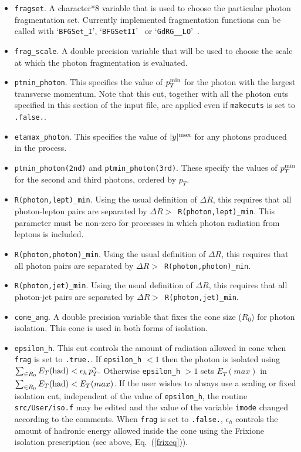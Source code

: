 \documentclass[12pt]{article}
\begin{document}
\begin{itemize}
\item {\tt fragset}. A character*8 variable that is used to choose the particular photon fragmentation set.
Currently implemented fragmentation functions can be called with `{\tt BFGSet\_I}', `{\tt BFGSetII}'~\cite{Bourhis:1997yu}
or `{\tt GdRG\_\_LO}'~\cite{GehrmannDeRidder:1998ba}.  

\item {\tt frag\_scale}. A double precision variable that will be used to choose the scale 
at which the photon fragmentation is evaluated. 

\item {\tt ptmin\_photon}. This specifies the value
of $p_T^{\rm min}$ for the photon with the largest transverse momentum.
Note that this cut, together with all the photon cuts specified in this section
of the input file, are applied even if {\tt makecuts} is set to {\tt .false.}.

\item {\tt etamax\_photon}. This specifies the value
of $|y|^{\rm max}$ for any photons produced in the process.

\item {\tt ptmin\_photon(2nd)} and {\tt ptmin\_photon(3rd)}. These specify the values
of $p_T^{\rm min}$ for the second and third photons, ordered by $p_T$.

\item {\tt R(photon,lept)\_min}. Using the usual definition of $\Delta R$,
this requires that all photon-lepton pairs are separated by
$\Delta R >$~{\tt R(photon,lept)\_min}. This parameter must be non-zero
for processes in which photon radiation from leptons is included.

\item {\tt R(photon,photon)\_min}. Using the usual definition of $\Delta R$,
this requires that all photon pairs are separated by
$\Delta R >$~{\tt R(photon,photon)\_min}.

\item {\tt R(photon,jet)\_min}. Using the usual definition of $\Delta R$,
this requires that all photon-jet pairs are separated by
$\Delta R >$~{\tt R(photon,jet)\_min}.

\item {\tt cone\_ang}. A double precision variable that fixes the cone size ($R_0$) for photon isolation.
This cone is used in both forms of isolation. 

\item {\tt epsilon\_h}. This cut controls the amount of radiation allowed in cone when  {\tt frag} is set to {\tt .true.}. If  {\tt epsilon\_h} $ < 1$ then the photon is isolated using
$\sum_{\in R_0} E_T{\rm{(had)}} < \epsilon_h \, p^{\gamma}_{T}.$ Otherwise {\tt epsilon\_h}  $ > 1$ sets $E_T(max)$ in  $\sum_{\in R_0} E_T{\rm{(had)}} < E_T(max)$.  
If the user wishes to always use a scaling or fixed isolation cut, independent of the value of {\tt epsilon\_h}, the routine
{\tt src/User/iso.f} may be edited and the value of the variable {\tt imode} changed according to the comments.
When {\tt frag} is set to {\tt .false.}, $\epsilon_h$ controls the amount of hadronic energy allowed inside the cone using the
Frixione isolation prescription (see above, Eq.~(\ref{frixeq})). 


\end{itemize}
\end{document}
